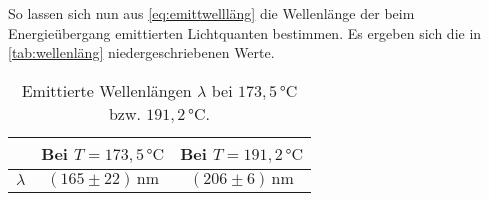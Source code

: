 So lassen sich nun aus \eqref{eq:emittwellläng} die Wellenlänge der beim Energieübergang emittierten Lichtquanten bestimmen.
Es ergeben sich die in \autoref{tab:wellenläng} niedergeschriebenen Werte.

\begin{table}[H]
    \centering
    \caption{Emittierte Wellenlängen $\lambda$ bei $173,5 \,\unit{\celsius}$ bzw. $191,2 \,\unit{\celsius}$.}
    \label{tab:wellenläng}
    \begin{tabular}{S S[table-format = 2.3] S[table-format = 2.3]}
      \toprule
      {}      &     {Bei $T = 173,5 \,\unit{\celsius}$} & {Bei $T = 191,2 \,\unit{\celsius}$}\\
      \midrule
         {$\lambda$}      &       {$\left( 165 \pm 22 \right)\, \unit{\nano\meter}$}      &     {$\left( 206 \pm 6 \right) \, \unit{\nano\meter}$}           \\
      \bottomrule
    \end{tabular}
\end{table}